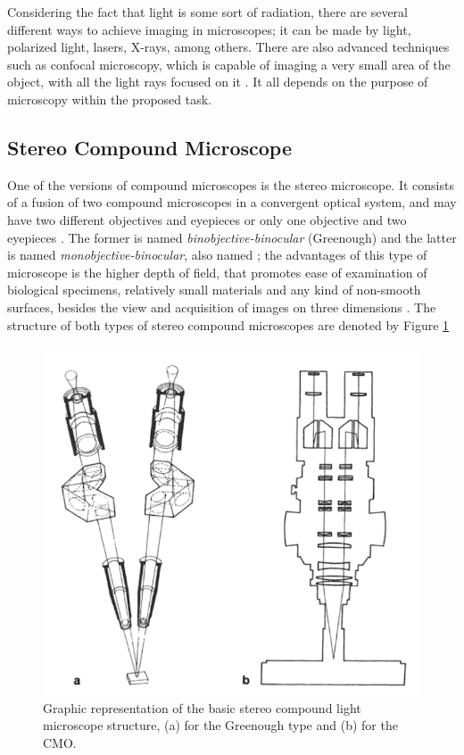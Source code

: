 Considering the fact that light is some sort of radiation, there are several different ways to achieve imaging in microscopes; it can be made by light, polarized light, lasers, X-rays, among others. There are also advanced techniques such as confocal microscopy, which is capable of imaging a very small area of the object, with all the light rays focused on it \cite{rochow1994introduction}. It all depends on the purpose of microscopy within the proposed task.

\subsection{Stereo Compound Microscope}


One of the versions of compound microscopes is the stereo microscope. It consists of a fusion of two compound microscopes in a convergent optical system, and may have two different objectives and eyepieces or only one objective and two eyepieces \cite{schreier2004advances}. The former is named \emph{binobjective-binocular} (Greenough) and the latter is named \emph{monobjective-binocular}, also named ; the advantages of this type of microscope is the higher depth of field, that promotes ease of examination of biological specimens, relatively small materials and any kind of non-smooth surfaces, besides the view and acquisition of images on three dimensions \cite{rochow1994introduction}. The structure of both types of stereo compound microscopes are denoted by Figure \ref{fig:stereo_compound_microscope}

\begin{figure}[H]
	\centering
	\caption{\label{fig:stereo_compound_microscope}Graphic representation of the basic stereo compound light microscope structure, (a) for the Greenough type and (b) for the CMO.}
	\begin{center}
	    \includegraphics[scale=0.4]{images/fig6.png}
	\end{center}
	\centering
\end{figure}